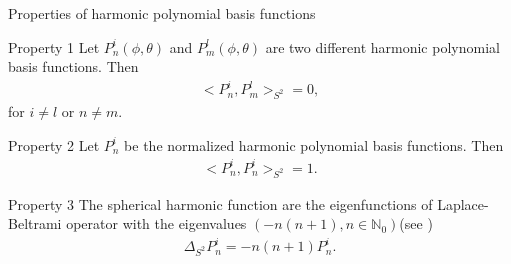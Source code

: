 \begin{frame}{Properties of harmonic polynomial basis functions}
	\scriptsize
	\begin{block}{Property 1}
		Let $P^{i}_{n}(\phi, \theta)$ and $P^{l}_{m}(\phi, \theta)$ are two different harmonic polynomial basis functions. Then
		\begin{align*}
			<P^i_n, P^l_m>_{S^2} = 0,
		\end{align*}
	for $i \neq l$ or $n \neq m$.
	\end{block}
	
	\begin{block}{Property 2}
		Let $P^i_{n}$ be the normalized harmonic polynomial basis functions. Then
		\begin{align*}
			<P^i_n, P^i_n>_{S^2} = 1.
		\end{align*}
	\end{block}

	\begin{block}{Property 3}
		The spherical harmonic function are the eigenfunctions of Laplace-Beltrami operator with the eigenvalues $(- n (n +1),n \in \mathbb{N}_0)$(see \cite{zbMATH01218597})
		\begin{align*}
			\Delta_{S^2}P^i_n = -n(n+1) P^i_n.
		\end{align*}
	\end{block}
\end{frame}



